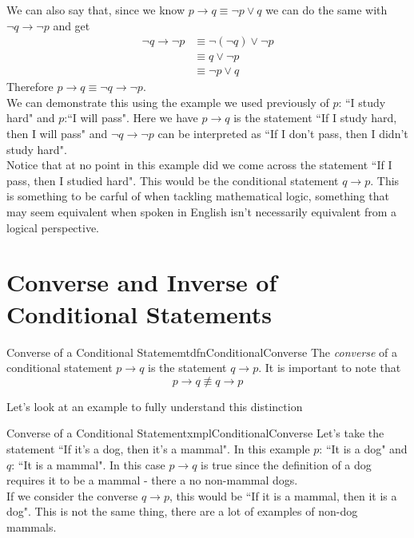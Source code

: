 We can also say that, since we know $p \to q \equiv \lnot p \lor q$ we can do the same with $\lnot q \to \lnot p$ and get
\begin{align*}
    \lnot q \to \lnot p & \equiv \lnot (\lnot q) \lor \lnot p          \\
                        & \equiv q \lor \lnot p \tag*{Double Negation} \\
                        & \equiv \lnot p \lor q
\end{align*}
Therefore $p \to q \equiv \lnot q \to \lnot p$.\\

We can demonstrate this using the example we used previously of $p$: ``I study hard" and $p$:``I will pass". Here we have $p \to q$ is the statement ``If I study hard, then I will pass" and $\lnot q \to \lnot p$ can be interpreted as ``If I don't pass, then I didn't study hard".\\

Notice that at no point in this example did we come across the statement ``If I pass, then I studied hard". This would be the conditional statement $q \to p$. This is something to be carful of when tackling mathematical logic, something that may seem equivalent when spoken in English isn't necessarily equivalent from a logical perspective.

\section{Converse and Inverse of Conditional Statements}

\begin{dfn}[label={def:conditionalConverse}]{Converse of a Conditional Statememt}{dfnConditionalConverse}
    The \emph{converse} of a conditional statement $p \to q$ is the statement $q \to p$. It is important to note that
    $$p \to q \not \equiv q \to p$$
\end{dfn}

Let's look at an example to fully understand this distinction

\begin{exmpl}[label={exmpl:conditionalConverse}]{Converse of a Conditional Statement}{xmplConditionalConverse}
    Let's take the statement ``If it's a dog, then it's a mammal". In this example $p$: ``It is a dog" and $q$: ``It is a mammal". In this case $p \to q$ is true since the definition of a dog requires it to be a mammal - there a no non-mammal dogs.\\

    If we consider the converse $q \to p$, this would be ``If it is a mammal, then it is a dog". This is not the same thing, there are a lot of examples of non-dog mammals.
\end{exmpl}

